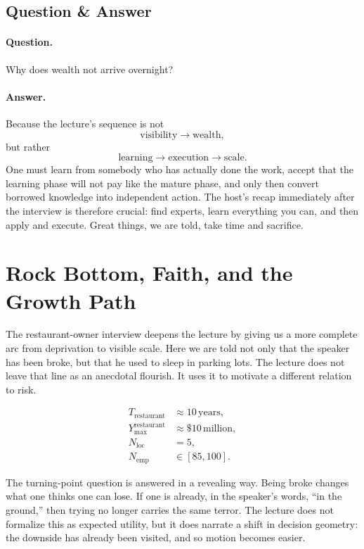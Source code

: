 \subsection{Question \& Answer}

\paragraph{Question.}
Why does wealth not arrive overnight?

\paragraph{Answer.}
Because the lecture's sequence is not
\[
\text{visibility} \longrightarrow \text{wealth},
\]
but rather
\[
\text{learning} \longrightarrow \text{execution} \longrightarrow \text{scale}.
\]
One must learn from somebody who has actually done the work, accept that the learning phase will not pay like the mature phase, and only then convert borrowed knowledge into independent action. The host's recap immediately after the interview is therefore crucial: find experts, learn everything you can, and then apply and execute. Great things, we are told, take time and sacrifice.

\section{Rock Bottom, Faith, and the Growth Path}

The restaurant-owner interview deepens the lecture by giving us a more complete arc from deprivation to visible scale. Here we are told not only that the speaker has been broke, but that he used to sleep in parking lots. The lecture does not leave that line as an anecdotal flourish. It uses it to motivate a different relation to risk.

\begin{align}
T_{\mathrm{restaurant}} &\approx 10\,\text{years},\\
Y_{\max}^{\mathrm{restaurant}} &\approx \$10\,\text{million},\\
N_{\mathrm{loc}} &= 5,\\
N_{\mathrm{emp}} &\in [85,100].
\end{align}

The turning-point question is answered in a revealing way. Being broke changes what one thinks one can lose. If one is already, in the speaker's words, ``in the ground,'' then trying no longer carries the same terror. The lecture does not formalize this as expected utility, but it does narrate a shift in decision geometry: the downside has already been visited, and so motion becomes easier.

